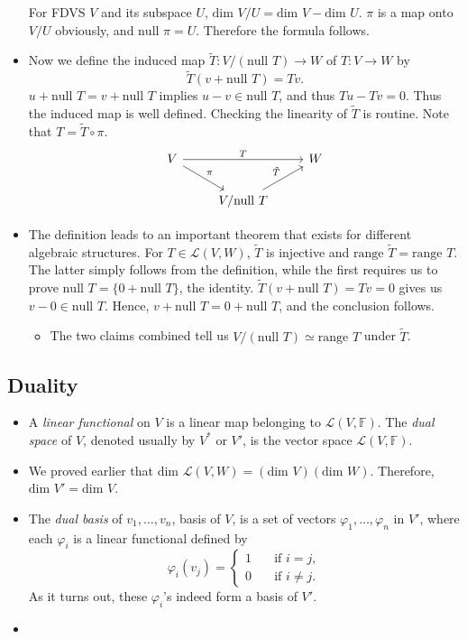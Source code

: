 \documentclass{article}
\newcommand{\F}{\mathbb{F}}
\newcommand{\n}{\text{null }}
\newcommand{\LVW}{\mathcal{L}(V,W)}
\renewcommand{\r}{\text{range }}
\renewcommand{\d}{\text{dim }}
\renewcommand{\phi}{\varphi}
\begin{document}
\begin{itemize}
    For FDVS $V$ and its subspace $U$, $\d V/U = \d V - \d U$. $\pi$ is a map onto $V/U$ obviously, and $\n \pi = U$. Therefore the formula follows.
    \item Now we define the induced map $\tilde{T}: V/(\n T) \to W$ of $T: V \to W$ by $$\tilde{T}(v+\n T) = Tv.$$ $u + \n T = v + \n T$ implies $u - v \in \n T$, and thus $Tu-Tv = 0$. Thus the induced map is well defined. Checking the linearity of $\tilde{T}$ is routine. Note that $T = \tilde{T} \circ \pi$.
    \begin{equation*}
            \begin{tikzcd}
                V \arrow[rr,"T"] \arrow[dr,"\pi"] && W \\
                & {V/\n T} \arrow[ur,"\tilde{T}"]
            \end{tikzcd}
        \end{equation*}
    \item The definition leads to an important theorem that exists for different algebraic structures. For $T \in \LVW$, $\tilde{T}$ is injective and $\r \tilde{T} = \r T$. The latter simply follows from the definition, while the first requires us to prove $\n T = \{0+\n T\}$, the identity. $\tilde{T}(v+\n T) = Tv = 0$ gives us $v-0 \in \n T$. Hence, $v+\n T = 0+\n T$, and the conclusion follows.
        \begin{itemize}
            \item The two claims combined tell us $V/(\n T) \simeq \r T$ under $\tilde{T}$.
        \end{itemize}
    \end{itemize}
    
\subsection{Duality}
\begin{itemize}
    \item A \textit{linear functional} on $V$ is a linear map belonging to $\mathcal{L}(V,\F)$. The \textit{dual space} of $V$, denoted usually by $V^*$ or $V'$, is the vector space $\mathcal{L}(V,\F)$.
    \item We proved earlier that $\d \LVW = (\d V)(\d W)$. Therefore, $\d V' = \d V$.
    \item The \textit{dual basis} of $v_1,\dots,v_n$, basis of $V$, is a set of vectors $\phi_1,\dots,\phi_n$ in $V'$, where each $\phi_i$ is a linear functional defined by
    \begin{equation*}
        \phi_i(v_j) = \left\{
            \begin{array}{rl}
                1 \quad & \text{if } i = j, \\
                0 \quad & \text{if } i \not= j.
            \end{array}
        \right.
    \end{equation*}
    As it turns out, these $\phi_i$'s indeed form a basis of $V'$. 
    
    \item
\end{itemize}
\end{document}
